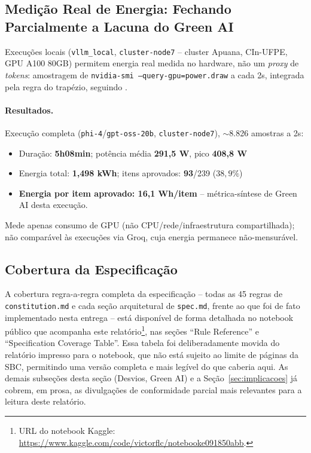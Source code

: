 \documentclass[12pt]{article}
\begin{document}
\subsection{Medição Real de Energia: Fechando Parcialmente a Lacuna do Green AI}
\label{sec:green-ai-medido}

Execuções locais (\texttt{vllm\_local}, \texttt{cluster-node7} -- cluster
Apuana, CIn-UFPE, GPU A100 80GB) permitem energia real medida no
hardware, não um \emph{proxy} de \emph{tokens}: amostragem de
\texttt{nvidia-smi --query-gpu=power.draw} a cada 2s, integrada pela
regra do trapézio, seguindo \cite{chung2026joules,wang2026systematic}.

\paragraph{Resultados.} Execução completa
(\texttt{phi-4}/\texttt{gpt-oss-20b}, \texttt{cluster-node7}),
$\sim$8.826 amostras a 2s:
\begin{itemize}
  \item Duração: \textbf{5h08min}; potência média \textbf{291,5 W}, pico
    \textbf{408,8 W}
  \item Energia total: \textbf{1,498 kWh}; itens aprovados:
    \textbf{93}/239 ($38{,}9\%$)
  \item \textbf{Energia por item aprovado: 16,1 Wh/item} -- métrica-síntese
    de Green AI desta execução.
\end{itemize}
Mede apenas consumo de GPU (não CPU/rede/infraestrutura compartilhada);
não comparável às execuções via Groq, cuja energia permanece
não-mensurável.

\subsection{Cobertura da Especificação}
\label{sec:cobertura}

A cobertura regra-a-regra completa da especificação -- todas as 45
regras de \texttt{constitution.md} e cada seção arquitetural de
\texttt{spec.md}, frente ao que foi de fato implementado nesta entrega
-- está disponível de forma detalhada no notebook público que acompanha
este relatório\footnote{URL do notebook Kaggle: \url{https://www.kaggle.com/code/victorflc/notebooke091850abb}.},
nas seções ``Rule Reference'' e ``Specification Coverage Table''. Essa
tabela foi deliberadamente movida do relatório impresso para o
notebook, que não está sujeito ao limite de páginas da SBC, permitindo
uma versão completa e mais legível do que caberia aqui. As demais
subseções desta seção (Desvios, Green AI) e a Seção~\ref{sec:implicacoes}
já cobrem, em prosa, as divulgações de conformidade parcial mais
relevantes para a leitura deste relatório.
\end{document}
